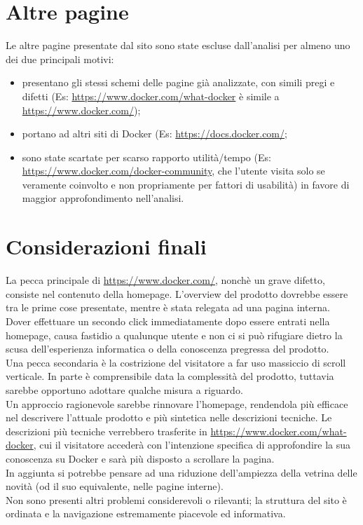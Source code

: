 \documentclass[a4paper]{article}
\begin{document}
\section{Altre pagine}
Le altre pagine presentate dal sito sono state escluse dall'analisi per almeno uno dei due principali motivi:

\begin{itemize}
	\item presentano gli stessi schemi delle pagine già analizzate, con simili pregi e difetti (Es: \url{https://www.docker.com/what-docker} è simile a \url{https://www.docker.com/});
    \item portano ad altri siti di Docker (Es: \url{https://docs.docker.com/};
    \item sono state scartate per scarso rapporto utilità/tempo (Es: \url{https://www.docker.com/docker-community}, che l'utente visita solo se veramente coinvolto e non propriamente per fattori di usabilità) in favore di maggior approfondimento nell'analisi.
\end{itemize}

\section{Considerazioni finali}
La pecca principale di \url{https://www.docker.com/}, nonchè un grave difetto, consiste nel contenuto della homepage. L'overview del prodotto dovrebbe essere tra le prime cose presentate, mentre è stata relegata ad una pagina interna.
\\
Dover effettuare un secondo click immediatamente dopo essere entrati nella homepage, causa fastidio a qualunque utente e non ci si può rifugiare dietro la scusa dell'esperienza informatica o della conoscenza pregressa del prodotto.
\\
Una pecca secondaria è la costrizione del visitatore a far uso massiccio di scroll verticale. In parte è comprensibile data la complessità del prodotto, tuttavia sarebbe opportuno adottare qualche misura a riguardo.
\\
Un approccio ragionevole sarebbe rinnovare l'homepage, rendendola più efficace nel descrivere l'attuale prodotto e più sintetica nelle descrizioni tecniche. Le descrizioni più tecniche verrebbero trasferite in \url{https://www.docker.com/what-docker}, cui il visitatore accederà con l'intenzione specifica di approfondire la sua conoscenza su Docker e sarà più disposto a scrollare la pagina.
\\
In aggiunta si potrebbe pensare ad una riduzione dell'ampiezza della vetrina delle novità (od il suo equivalente, nelle pagine interne).
\\
Non sono presenti altri problemi considerevoli o rilevanti; la struttura del sito è ordinata e la navigazione estremamente piacevole ed informativa.
\end{document}
